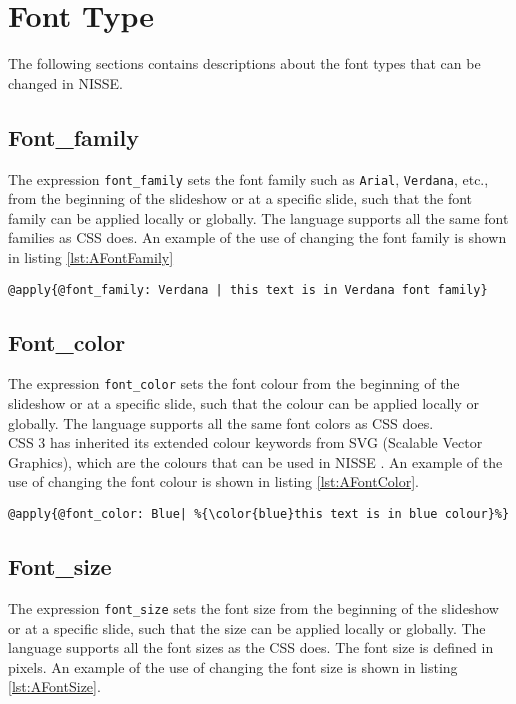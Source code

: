 \chapter{Font Type}
\label{AppendixFontType}
The following sections contains descriptions about the font types that can be changed in NISSE.

\section{Font\_family}
The expression \texttt{font\_family} sets the font family such as \texttt{Arial}, \texttt{Verdana}, etc., from the beginning of the slideshow or at a specific slide, such that the font family can be applied locally or globally. The language supports all the same font families as CSS does. An example of the use of changing the font family is shown in listing \ref{lst:AFontFamily}

\begin{lstlisting}[frame=single, caption=Changing font family, label=lst:AFontFamily ]
	@apply{@font_family: Verdana | this text is in Verdana font family}
\end{lstlisting}

\section{Font\_color}
The expression \texttt{font\_color} sets the font colour from the beginning of the slideshow or at a specific slide, such that the colour can be applied locally or globally. The language supports all the same font colors as CSS does. \\
CSS 3 has inherited its extended colour keywords from SVG (Scalable Vector Graphics), which are the colours that can be used in NISSE \cite{W3}. An example of the use of changing the font colour is shown in listing \ref{lst:AFontColor}.

\begin{lstlisting}[frame=single, caption=Changing font colour, label=lst:AFontColor]
	@apply{@font_color: Blue| %{\color{blue}this text is in blue colour}%}
\end{lstlisting}

\section{Font\_size}
The expression \texttt{font\_size} sets the font size from the beginning of the slideshow or at a specific slide, such that the size can be applied locally or globally. The language supports all the font sizes as the CSS does. The font size is defined in pixels. An example of the use of changing the font size is shown in listing \ref{lst:AFontSize}.

